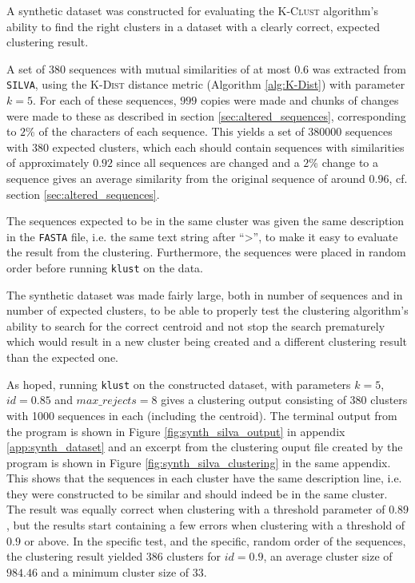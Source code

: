 A synthetic dataset was constructed for evaluating the \textsc{K-Clust}
algorithm's ability to find the right clusters in a dataset with a clearly
correct, expected clustering result.

A set of $380$ sequences with mutual similarities of at most $0.6$ was
extracted from \texttt{SILVA}, using the \textsc{K-Dist} distance metric
(Algorithm \ref{alg:K-Dist}) with parameter $k=5$. For each of these
sequences, $999$ copies were made and chunks of changes were made to these as
described in section \ref{sec:altered_sequences}, corresponding to $2$\%
of the characters of each sequence. This yields a set of \num{380000}
sequences with $380$ expected clusters, which each should contain sequences
with similarities of approximately $0.92$ since all sequences are changed and
a $2$\% change to a sequence gives an average similarity from the original
sequence of around $0.96$, cf. section \ref{sec:altered_sequences}.

The sequences expected to be in the same cluster was given the same description
in the \texttt{FASTA} file, i.e. the same text string after ``>'', to make it
easy to evaluate the result from the clustering. Furthermore, the sequences
were placed in random order before running \texttt{klust} on the data.

The synthetic dataset was made fairly large, both in number of sequences and in
number of expected clusters, to be able to properly test the clustering
algorithm's ability to search for the correct centroid and not stop the search
prematurely which would result in a new cluster being created and a different
clustering result than the expected one.

As hoped, running \texttt{klust} on the constructed dataset, with parameters
$k=5$, $id=0.85$ and $max\_rejects=8$ gives a clustering output consisting of
$380$ clusters with 1000 sequences in each (including the centroid). The
terminal output from the program is shown in Figure
\ref{fig:synth_silva_output} in appendix \ref{app:synth_dataset} and an
excerpt from the clustering ouput file created by the program is shown in
Figure \ref{fig:synth_silva_clustering} in the same appendix. This shows that
the sequences in each cluster have the same description line, i.e. they were
constructed to be similar and should indeed be in the same cluster. The result
was equally correct when clustering with a threshold parameter of $0.89$, but
the results start containing a few errors when clustering with a threshold of
$0.9$ or above. In the specific test, and the specific, random order of the
sequences, the clustering result yielded $386$ clusters for $id=0.9$, an average
cluster size of $984.46$ and a minimum cluster size of $33$.

